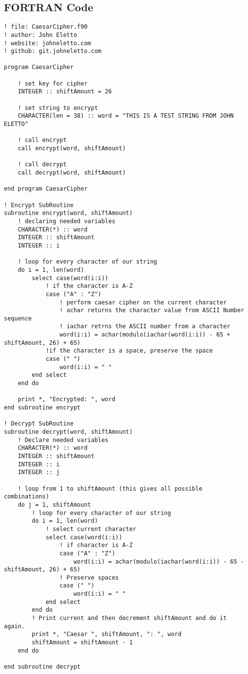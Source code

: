 \documentclass{article}
\begin{document}
\subsection*{FORTRAN Code}
\begin{lstlisting}
! file: CaesarCipher.f90
! author: John Eletto 
! website: johneletto.com
! github: git.johneletto.com

program CaesarCipher

    ! set key for cipher
    INTEGER :: shiftAmount = 26

    ! set string to encrypt
    CHARACTER(len = 38) :: word = "THIS IS A TEST STRING FROM JOHN ELETTO"

    ! call encrypt
    call encrypt(word, shiftAmount)

    ! call decrypt
    call decrypt(word, shiftAmount)

end program CaesarCipher

! Encrypt SubRoutine
subroutine encrypt(word, shiftAmount)
    ! declaring needed variables
    CHARACTER(*) :: word
    INTEGER :: shiftAmount
    INTEGER :: i

    ! loop for every character of our string
    do i = 1, len(word)
        select case(word(i:i))
            ! if the character is A-Z
            case ("A" : "Z")
                ! perform caesar cipher on the current character
                ! achar returns the character value from ASCII Number sequence
                ! iachar retrns the ASCII number from a character
                word(i:i) = achar(modulo(iachar(word(i:i)) - 65 + shiftAmount, 26) + 65)
            !if the character is a space, preserve the space
            case (" ")
                word(i:i) = " "
        end select
    end do

    print *, "Encrypted: ", word
end subroutine encrypt

! Decrypt SubRoutine
subroutine decrypt(word, shiftAmount)
    ! Declare needed variables
    CHARACTER(*) :: word
    INTEGER :: shiftAmount
    INTEGER :: i
    INTEGER :: j

    ! loop from 1 to shiftAmount (this gives all possible combinations)
    do j = 1, shiftAmount
        ! loop for every character of our string
        do i = 1, len(word)
            ! select current character
            select case(word(i:i))
                ! if character is A-Z
                case ("A" : "Z")
                    word(i:i) = achar(modulo(iachar(word(i:i)) - 65 - shiftAmount, 26) + 65)
                ! Preserve spaces
                case (" ")
                    word(i:i) = " "
            end select
        end do
        ! Print current and then decrement shiftAmount and do it again.
        print *, "Caesar ", shiftAmount, ": ", word
        shiftAmount = shiftAmount - 1
    end do
    
end subroutine decrypt
\end{lstlisting}
\end{document}
